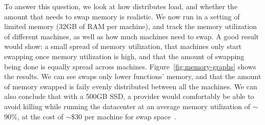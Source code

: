 To answer this question, we look at how \sys{} distributes load, and whether the
amount that \sys{} needs to swap memory is realistic. We now run \sys{} in a
setting of limited memory (32GB of RAM per machine), and track the memory
utilization of different machines, as well as how much machines need to swap. A
good result would show: a small spread of memory utilization, that machines only
start swapping once memory utilization is high, and that the amount of swapping
being done is equally spread across machines. Figure~\ref{fig:memory-graphs}
shows the results. We can see \sys{} swaps only lower \class{} functions'
memory, and that the amount of memory swapped is faily evenly distributed
between all the machines. We can also conclude that with a 500GB SSD, a provider
would comfortably be able to avoid killing while running the datacenter at an
average memory utilization of $\sim$90$\%$, at the cost of $\sim\$$30 per
machine for swap space~\cite{ssd-price}.


